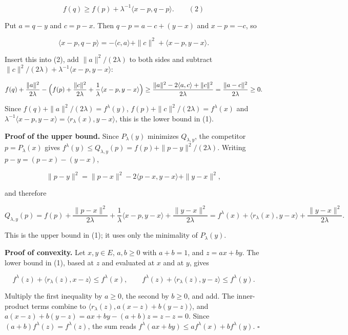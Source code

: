 \documentclass[11pt,a4paper]{article}
\begin{document}
\[f(q)\ge f(p)+\lambda^{-1}\langle x-p,q-p\rangle.\qquad(2)\]


Put \(a=q-y\) and \(c=p-x\). Then \(q-p=a-c+(y-x)\) and \(x-p=-c\), so


\[\langle x-p,q-p\rangle=-\langle c,a\rangle+\|c\|^2+\langle x-p,y-x\rangle.\]


Insert this into (2), add \(\|a\|^2/(2\lambda)\) to both sides and subtract \(\|c\|^2/(2\lambda)+\lambda^{-1}\langle x-p,y-x\rangle\):


\[f(q)+\frac{\|a\|^2}{2\lambda}-\Bigl(f(p)+\frac{\|c\|^2}{2\lambda}+\frac1\lambda\langle x-p,y-x\rangle\Bigr)\ge\frac{\|a\|^2-2\langle a,c\rangle+\|c\|^2}{2\lambda}=\frac{\|a-c\|^2}{2\lambda}\ge0.\]


Since \(f(q)+\|a\|^2/(2\lambda)=f^\lambda(y)\), \(f(p)+\|c\|^2/(2\lambda)=f^\lambda(x)\) and \(\lambda^{-1}\langle x-p,y-x\rangle=\langle r_\lambda(x),y-x\rangle\), this is the lower bound in (1).




\textbf{Proof of the upper bound.} Since \(P_\lambda(y)\) minimizes \(Q_{\lambda,y}\), the competitor \(p=P_\lambda(x)\) gives \(f^\lambda(y)\le Q_{\lambda,y}(p)=f(p)+\|p-y\|^2/(2\lambda)\). Writing \(p-y=(p-x)-(y-x)\),


\[\|p-y\|^2=\|p-x\|^2-2\langle p-x,y-x\rangle+\|y-x\|^2,\]


and therefore


\[Q_{\lambda,y}(p)=f(p)+\frac{\|p-x\|^2}{2\lambda}+\frac1\lambda\langle x-p,y-x\rangle+\frac{\|y-x\|^2}{2\lambda}=f^\lambda(x)+\langle r_\lambda(x),y-x\rangle+\frac{\|y-x\|^2}{2\lambda}.\]


This is the upper bound in (1); it uses only the minimality of \(P_\lambda(y)\).




\textbf{Proof of convexity.} Let \(x,y\in E\), \(a,b\ge0\) with \(a+b=1\), and \(z=ax+by\). The lower bound in (1), based at \(z\) and evaluated at \(x\) and at \(y\), gives


\[f^\lambda(z)+\langle r_\lambda(z),x-z\rangle\le f^\lambda(x),\qquad f^\lambda(z)+\langle r_\lambda(z),y-z\rangle\le f^\lambda(y).\]


Multiply the first inequality by \(a\ge0\), the second by \(b\ge0\), and add. The inner-product terms combine to \(\langle r_\lambda(z),a(x-z)+b(y-z)\rangle\), and \(a(x-z)+b(y-z)=ax+by-(a+b)z=z-z=0\). Since \((a+b)f^\lambda(z)=f^\lambda(z)\), the sum reads \(f^\lambda(ax+by)\le af^\lambda(x)+bf^\lambda(y)\). \(\square\)
\end{document}
